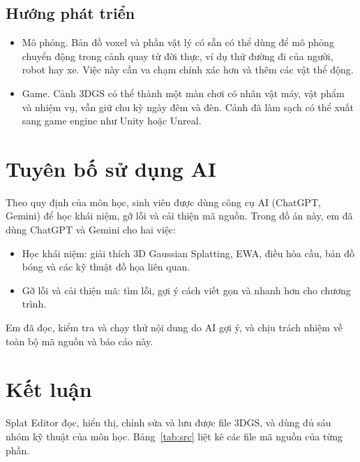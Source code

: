 \documentclass[9pt,twocolumn,a4paper]{extarticle}
\begin{document}
\subsection{Hướng phát triển}
\begin{itemize}\itemsep0pt
\item Mô phỏng. Bản đồ voxel và phần vật lý có sẵn có thể dùng để mô phỏng chuyển động trong cảnh quay từ đời thực, ví dụ thử đường đi của người, robot hay xe. Việc này cần va chạm chính xác hơn và thêm các vật thể động.
\item Game. Cảnh 3DGS có thể thành một màn chơi có nhân vật máy, vật phẩm và nhiệm vụ, vẫn giữ chu kỳ ngày đêm và đèn. Cảnh đã làm sạch có thể xuất sang game engine như Unity hoặc Unreal.
\end{itemize}

\section{Tuyên bố sử dụng AI}
\label{chap:ai}
Theo quy định của môn học, sinh viên được dùng công cụ AI (ChatGPT, Gemini) để học khái niệm, gỡ lỗi và cải thiện mã nguồn. Trong đồ án này, em đã dùng ChatGPT và Gemini cho hai việc:
\begin{itemize}\itemsep0pt
\item Học khái niệm: giải thích 3D Gaussian Splatting, EWA, điều hòa cầu, bản đồ bóng và các kỹ thuật đồ họa liên quan.
\item Gỡ lỗi và cải thiện mã: tìm lỗi, gợi ý cách viết gọn và nhanh hơn cho chương trình.
\end{itemize}
Em đã đọc, kiểm tra và chạy thử nội dung do AI gợi ý, và chịu trách nhiệm về toàn bộ mã nguồn và báo cáo này.

\section{Kết luận}
\label{chap:end}
Splat Editor đọc, hiển thị, chỉnh sửa và lưu được file 3DGS, và dùng đủ sáu nhóm kỹ thuật của môn học. Bảng~\ref{tab:src} liệt kê các file mã nguồn của từng phần.
\end{document}
